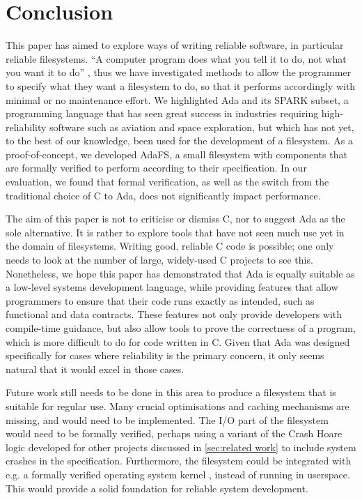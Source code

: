 \section{Conclusion}
This paper has aimed to explore ways of writing reliable software, in particular reliable filesystems.
``A computer program does what you tell it to do, not what you want it to do'' \cite{bloch1997}, thus we have investigated methods to allow the programmer to specify what they want a filesystem to do, so that it performs accordingly with minimal or no maintenance effort.
We highlighted Ada and its SPARK subset, a programming language that has seen great success in industries requiring high-reliability software such as aviation and space exploration, but which has not yet, to the best of our knowledge, been used for the development of a filesystem.
As a proof-of-concept, we developed AdaFS, a small filesystem with components that are formally verified to perform according to their specification.
In our evaluation, we found that formal verification, as well as the switch from the traditional choice of C to Ada, does not significantly impact performance.

The aim of this paper is not to criticise or dismiss C, nor to suggest Ada as the sole alternative.
It is rather to explore tools that have not seen much use yet in the domain of filesystems.
Writing good, reliable C code is possible; one only needs to look at the number of large, widely-used C projects to see this.
Nonetheless, we hope this paper has demonstrated that Ada is equally suitable as a low-level systems development language, while providing features that allow programmers to ensure that their code runs exactly as intended, such as functional and data contracts.
These features not only provide developers with compile-time guidance, but also allow tools to prove the correctness of a program, which is more difficult to do for code written in C.
Given that Ada was designed specifically for cases where reliability is the primary concern, it only seems natural that it would excel in those cases.

Future work still needs to be done in this area to produce a filesystem that is suitable for regular use.
Many crucial optimisations and caching mechanisms are missing, and would need to be implemented.
The I/O part of the filesystem would need to be formally verified, perhaps using a variant of the Crash Hoare logic developed for other projects discussed in \autoref{sec:related work} to include system crashes in the specification.
Furthermore, the filesystem could be integrated with e.g. a formally verified operating system kernel \cite{king2019}, instead of running in userspace.
This would provide a solid foundation for reliable system development.
